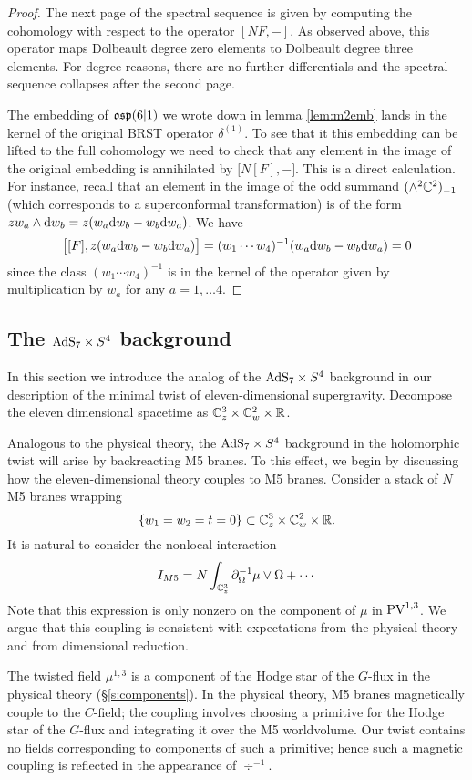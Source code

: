 \begin{proof}
The next page of the spectral sequence is given by computing the cohomology with respect to the operator $[N F,-]$. 
As observed above, this operator maps Dolbeault degree zero elements to Dolbeault degree three elements. 
For degree reasons, there are no further differentials and the spectral sequence collapses after the second page. 

The embedding of $\mathfrak{osp}(6|1)$ we wrote down in lemma \ref{lem:m2emb} lands in the kernel of the original BRST operator $\delta^{(1)}$. 
To see that it this embedding can be lifted to the full cohomology we need to check that any element in the image of the original embedding is annihilated by $\big[ N [F] , - \big]$. 
This is a direct calculation. 
For instance, recall that an element in the image of the odd summand $(\wedge^2 \mathbb C^2)_{-1}$ (which corresponds to a superconformal transformation) is of the form $z w_a \wedge {\rm d} w_b = z(w_a {\rm d} w_b - w_b {\rm d} w_a)$. 
We have
\[
\big[[F] , z(w_a {\rm d} w_b - w_b {\rm d} w_a) \big] = (w_1\cdots w_4)^{-1} (w_a {\rm d} w_b - w_b {\rm d} w_a) = 0
\]
since the class $(w_1\cdots w_4)^{-1}$ is in the kernel of the operator given by multiplication by $w_a$ for any $a = 1,\ldots 4$. 
\end{proof}

\subsection{The ${\rm AdS}_7 \times S^4$ background}

In this section we introduce the analog of the ${\rm AdS}_7 \times S^4$ background in our description of the minimal twist of eleven-dimensional supergravity. Decompose the eleven dimensional spacetime as $\mathbb{C}^3_z\times \mathbb{C}^2_w\times \mathbb{R}$.


Analogous to the physical theory, the ${\rm AdS}_7 \times S^4$ background in the holomorphic twist will arise by backreacting M5 branes. To this effect, we begin by discussing how the eleven-dimensional theory couples to M5 branes. 
Consider a stack of $N$ M5 branes wrapping 
\[
\{w_1=w_2=t=0\} \subset \mathbb{C}^3_z\times \mathbb{C}^2_w\times \mathbb{R}.
\] 
It is natural to consider the nonlocal interaction 
\[
I_{M5} = N\int_{\mathbb{C}^3_z} \partial_{\Omega}^{-1}\mu \vee \Omega +\cdots 
\]
Note that this expression is only nonzero on the component of $\mu$ in ${\rm PV}^{1,3}$. 
We argue that this coupling is consistent with expectations from the physical theory and from dimensional reduction. 

The twisted field $\mu^{1,3}$ is a component of the Hodge star of the $G$-flux in the physical theory (\S\ref{s:components}). 
In the physical theory, M5 branes magnetically couple to the $C$-field; the coupling involves choosing a primitive for the Hodge star of the $G$-flux and integrating it over the M5 worldvolume. Our twist contains no fields corresponding to components of such a primitive; hence such a magnetic coupling is reflected in the appearance of $\div^{-1}$. 

